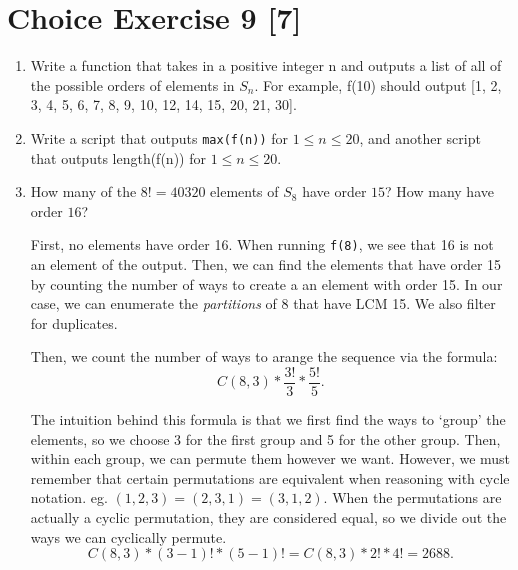 \documentclass{article}
\begin{document}

\pagebreak

\section*{Choice Exercise 9 [7]}

\begin{enumerate}
    \item 
        Write a function that takes in a positive integer n and outputs a list 
        of all of the possible orders of elements in \(S_n\). For example, f(10)
        should output [1, 2, 3, 4, 5, 6, 7, 8, 9, 10, 12, 14, 15, 20, 21, 30].

        

    \item 
        Write a script that outputs \verb|max(f(n))| for \(1 \leq n \leq 20\), and 
        another script that outputs length(f(n)) for \(1 \leq n \leq 20\).

        

    \item 
        How many of the \(8! = 40320\) elements of \(S_{8}\) have order \(15\)? 
        How many have order \(16\)?
    
        First, no elements have order 16. When running \verb|f(8)|, we see that 
        16 is not an element of the output.
        Then, we can find the elements that have order 15 by counting the number 
        of ways to create a an element with order 15. In our case, we can enumerate 
        the \emph{partitions} of 8 that have LCM 15. We also filter for duplicates.

        

        Then, we count the number of ways to arange the sequence via the formula:
        \[C(8, 3) * \frac{3!}{3} * \frac{5!}{5}.\]

        The intuition behind this formula is that we first find the ways to `group'
        the elements, so we choose 3 for the first group and 5 for the other group.
        Then, within each group, we can permute them however we want. However,
        we must remember that certain permutations are equivalent when reasoning 
        with cycle notation. eg. \((1,2,3) = (2,3,1) = (3,1,2)\). When the permutations 
        are actually a cyclic permutation, they are considered equal, so we divide 
        out the ways we can cyclically permute. 
        \[C(8, 3) * (3-1)! * (5-1)! = C(8,3) * 2! * 4! = 2688.\]


\end{enumerate}
\end{document}
